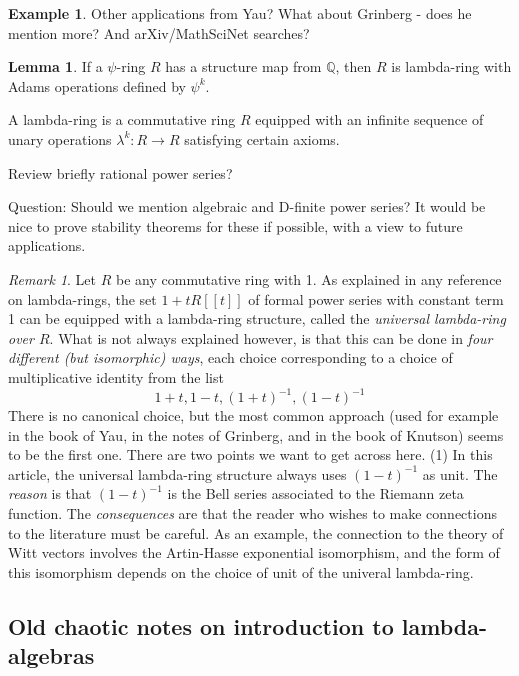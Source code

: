 \documentclass[a4paper]{article}
\theoremstyle{definition}
\newtheorem{example}{Example}[section]
\newtheorem{lemma}[theorem]{Lemma}
\theoremstyle{remark}
\newtheorem*{remark}{Remark}
\newcommand{\Q}{\mathbb{Q}}
\begin{document}
\begin{example}
Other applications from Yau? What about Grinberg - does he mention more? And arXiv/MathSciNet searches?
\end{example}




\begin{lemma}
If a $\psi$-ring $R$ has a structure map from $\Q$, then $R$ is lambda-ring with Adams operations defined by $\psi^k$.
\end{lemma}


A lambda-ring is a commutative ring $R$ equipped with an infinite sequence of unary operations $\lambda^k: R \to R$ satisfying certain axioms. 




Review briefly rational power series?

Question: Should we mention algebraic and D-finite power series? It would be nice to prove stability theorems for these if possible, with a view to future applications.

\begin{remark}
Let $R$ be any commutative ring with 1. As explained in any reference on lambda-rings, the set $1 + t R[[t]]$ of formal power series with constant term 1 can be equipped with a lambda-ring structure, called the \emph{universal lambda-ring over $R$}. What is not always explained however, is that this can be done in \emph{four different (but isomorphic) ways}, each choice corresponding to a choice of multiplicative identity from the list
$$ 1+t, 1-t, (1+t)^{-1}, (1-t)^{-1} $$
There is no canonical choice, but the most common approach (used for example in the book of Yau, in the notes of Grinberg, and in the book of Knutson) seems to be the first one. There are two points we want to get across here. (1) In this article, the universal lambda-ring structure always uses $(1-t)^{-1}$ as unit. The \emph{reason} is that $(1-t)^{-1}$ is the Bell series associated to the Riemann zeta function. The \emph{consequences} are that the reader who wishes to make connections to the literature must be careful. As an example, the connection to the theory of Witt vectors involves the Artin-Hasse exponential isomorphism, and the form of this isomorphism depends on the choice of unit of the univeral lambda-ring.
\end{remark}



\subsection{Old chaotic notes on introduction to lambda-algebras}
\end{document}
